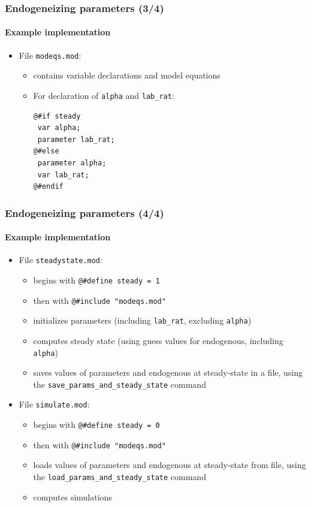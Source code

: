 \documentclass{beamer}
\begin{document}
\begin{frame}[fragile=singleslide]
  \frametitle{Endogeneizing parameters (3/4)}
  \framesubtitle{Example implementation}
  \begin{itemize}
  \item File \texttt{modeqs.mod}:
    \begin{itemize}
    \item contains variable declarations and model equations
    \item For declaration of \texttt{alpha} and \texttt{lab\_rat}:
    \footnotesize
\begin{verbatim}
@#if steady
 var alpha;
 parameter lab_rat;
@#else
 parameter alpha;
 var lab_rat;
@#endif
\end{verbatim}
    \normalsize
    \end{itemize}

  \end{itemize}
\end{frame}

\begin{frame}[fragile=singleslide]
  \frametitle{Endogeneizing parameters (4/4)}
  \framesubtitle{Example implementation}
  \begin{itemize}
  \item File \texttt{steadystate.mod}:
    \begin{itemize}
    \item begins with \verb+@#define steady = 1+
    \item then with \verb+@#include "modeqs.mod"+
    \item initializes parameters (including \texttt{lab\_rat}, excluding \texttt{alpha})
    \item computes steady state (using guess values for endogenous, including \texttt{alpha})
    \item saves values of parameters and endogenous at steady-state in a file, using the \texttt{save\_params\_and\_steady\_state} command
    \end{itemize}
  \item File \texttt{simulate.mod}:
    \begin{itemize}
    \item begins with \verb+@#define steady = 0+
    \item then with \verb+@#include "modeqs.mod"+
    \item loads values of parameters and endogenous at steady-state from file, using the \texttt{load\_params\_and\_steady\_state} command
    \item computes simulations
    \end{itemize}
  \end{itemize}
\end{frame}
\end{document}
